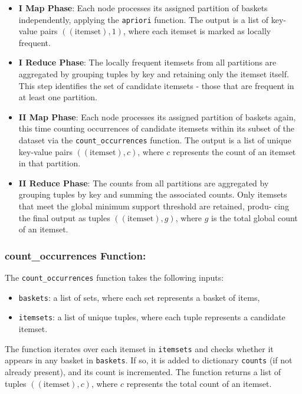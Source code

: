 \documentclass{Class/julia}
\begin{document}
\begin{itemize}
    \item \textbf{I Map Phase}: Each node processes its assigned partition of baskets independently, applying the \texttt{apriori} function. The output is a list of key-value pairs \(((\text{itemset}), 1)\), where each itemset is marked as locally frequent.

    \item \textbf{I Reduce Phase}: The locally frequent itemsets from all partitions are aggregated by grouping tuples by key and retaining only the itemset itself. This step identifies the set of candidate itemsets - those that are frequent in at least one partition.

    \item \textbf{II Map Phase}: Each node processes its assigned partition of baskets again, this time counting occurrences of candidate itemsets within its subset of the dataset via the \texttt{count\_occurrences} function. The output is a list of unique key-value pairs \(((\text{itemset}), c)\), where \( c \) represents the count of an itemset in that partition.

    \item \textbf{II Reduce Phase}: The counts from all partitions are aggregated by grouping tuples by key and summing the associated counts. Only itemsets that meet the global minimum support threshold are retained, produ- cing the final output as tuples \(((\text{itemset}), g)\), where \( g \) is the total global count of an itemset.
\end{itemize}

\subsubsection*{count\_occurrences Function:}

The \texttt{count\_occurrences} function takes the following inputs:

\begin{itemize}
\item \texttt{baskets}: a list of sets, where each set represents a basket of items,
\item \texttt{itemsets}: a list of unique tuples, where each tuple represents a candidate itemset.
\end{itemize}

The function iterates over each itemset in \texttt{itemsets} and checks whether it appears in any basket in \texttt{baskets}. If so, it is added to dictionary \texttt{counts} (if not already present), and its count is incremented. The function returns a list of tuples \(((\text{itemset}), c)\), where \( c \) represents the total count of an itemset.
\end{document}
